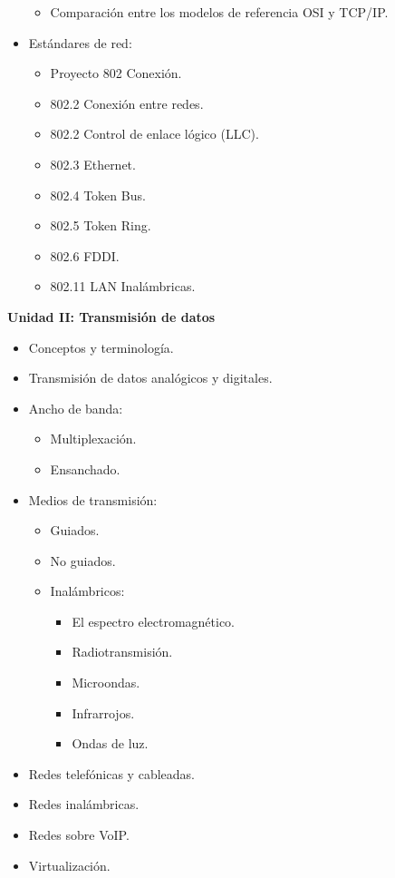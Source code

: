 \begin{itemize}
\begin{itemize}
		      \item Comparación entre los modelos de referencia OSI y TCP/IP.
	      \end{itemize}
	\item Estándares de red:
	      \begin{itemize}
		      \item Proyecto 802 Conexión.
		      \item 802.2 Conexión entre redes.
		      \item 802.2 Control de enlace lógico (LLC).
		      \item 802.3 Ethernet.
		      \item 802.4 Token Bus.
		      \item 802.5 Token Ring.
		      \item 802.6 FDDI.
		      \item 802.11 LAN Inalámbricas.
	      \end{itemize}
\end{itemize}\vspace{0.5cm}

\textbf{Unidad II: Transmisión de datos}
\begin{itemize}
	\item Conceptos y terminología.
	\item Transmisión de datos analógicos y digitales.
	\item Ancho de banda:
	      \begin{itemize}
		      \item Multiplexación.
		      \item Ensanchado.
	      \end{itemize}
	\item Medios de transmisión:
	      \begin{itemize}
		      \item Guiados.
		      \item No guiados.
		      \item Inalámbricos:
		            \begin{itemize}
			            \item El espectro electromagnético.
			            \item Radiotransmisión.
			            \item Microondas.
			            \item Infrarrojos.
			            \item Ondas de luz.
		            \end{itemize}
	      \end{itemize}
	\item Redes telefónicas y cableadas.
	\item Redes inalámbricas.
	\item Redes sobre VoIP.
	\item Virtualización.
\end{itemize}\vspace{0.5cm}

